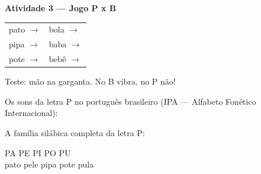 \begin{consolidacao}
\textbf{Atividade 3 --- Jogo P x B}


\begin{center}
\begin{tabular}{ll}
pato \quad $\rightarrow$ \underline{\hspace{2cm}} & bola \quad $\rightarrow$ \underline{\hspace{2cm}} \\
pipa \quad $\rightarrow$ \underline{\hspace{2cm}} & baba \quad $\rightarrow$ \underline{\hspace{2cm}} \\
pote \quad $\rightarrow$ \underline{\hspace{2cm}} & beb\^e \quad $\rightarrow$ \underline{\hspace{2cm}}
\end{tabular}
\end{center}
Teste: m\~a{}o na garganta. No B vibra, no P n\~a{}o!

\end{consolidacao}


\begin{sonsdaletra}
Os sons da letra P no portugu\^es{} brasileiro (IPA --- Alfabeto Fon\'etico Internacional):

\end{sonsdaletra}


\begin{familiasilabica}
A fam\'ilia sil\'abica completa da letra P:

\begin{center}
PA \quad PE \quad PI \quad PO \quad PU \\[0.5em] pato \quad pele \quad pipa \quad pote \quad pula
\end{center}
\end{familiasilabica}


